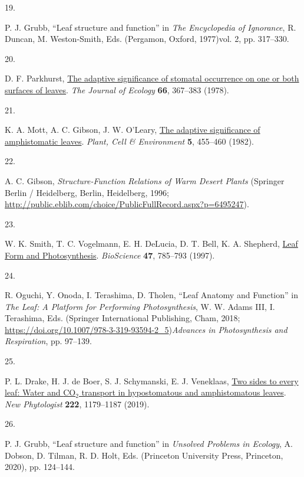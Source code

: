 \documentclass[
  letterpaper,
  DIV=11,
  numbers=noendperiod]{scrartcl}
\newlength{\cslhangindent}
\newlength{\csllabelwidth}
\newenvironment{CSLReferences}[2] %
 {\begin{list}{}{%
  \setlength{\itemindent}{0pt}
  \setlength{\leftmargin}{0pt}
  \setlength{\parsep}{0pt}
  \ifodd #1
   \setlength{\leftmargin}{\cslhangindent}
   \setlength{\itemindent}{-1\cslhangindent}
  \fi
  \setlength{\itemsep}{#2\baselineskip}}}
 {\end{list}}
\newcommand{\CSLLeftMargin}[1]{\parbox[t]{\csllabelwidth}{\strut#1\strut}}
\newcommand{\CSLRightInline}[1]{\parbox[t]{\linewidth - \csllabelwidth}{\strut#1\strut}}
\begin{document}
\begin{CSLReferences}{0}{1}
\CSLLeftMargin{19. }%
\CSLRightInline{P. J. Grubb, {``Leaf structure and function''} in
\emph{The Encyclopedia of Ignorance}, R. Duncan, M. Weston-Smith, Eds.
(Pergamon, Oxford, 1977)vol. 2, pp. 317--330.}

\CSLLeftMargin{20. }%
\CSLRightInline{D. F. Parkhurst,
\href{https://doi.org/10.2307/2259142}{The adaptive significance of
stomatal occurrence on one or both surfaces of leaves}. \emph{The
Journal of Ecology} \textbf{66}, 367--383 (1978).}

\CSLLeftMargin{21. }%
\CSLRightInline{K. A. Mott, A. C. Gibson, J. W. O'Leary,
\href{https://doi.org/10.1111/1365-3040.ep11611750}{The adaptive
significance of amphistomatic leaves}. \emph{Plant, Cell \& Environment}
\textbf{5}, 455--460 (1982).}

\CSLLeftMargin{22. }%
\CSLRightInline{A. C. Gibson, \emph{Structure-{Function} {Relations} of
{Warm} {Desert} {Plants}} (Springer Berlin / Heidelberg, Berlin,
Heidelberg, 1996;
\url{http://public.eblib.com/choice/PublicFullRecord.aspx?p=6495247}).}

\CSLLeftMargin{23. }%
\CSLRightInline{W. K. Smith, T. C. Vogelmann, E. H. DeLucia, D. T. Bell,
K. A. Shepherd, \href{https://doi.org/10.2307/1313100}{Leaf {Form} and
{Photosynthesis}}. \emph{BioScience} \textbf{47}, 785--793 (1997).}

\CSLLeftMargin{24. }%
\CSLRightInline{R. Oguchi, Y. Onoda, I. Terashima, D. Tholen, {``Leaf
{Anatomy} and {Function}''} in \emph{The {Leaf}: {A} {Platform} for
{Performing} {Photosynthesis}}, W. W. Adams III, I. Terashima, Eds.
(Springer International Publishing, Cham, 2018;
\url{https://doi.org/10.1007/978-3-319-93594-2_5})\emph{Advances in
{Photosynthesis} and {Respiration}}, pp. 97--139.}

\CSLLeftMargin{25. }%
\CSLRightInline{P. L. Drake, H. J. de Boer, S. J. Schymanski, E. J.
Veneklaas, \href{https://doi.org/10.1111/nph.15652}{Two sides to every
leaf: Water and {CO}\(_{\textrm{2}}\) transport in hypostomatous and
amphistomatous leaves}. \emph{New Phytologist} \textbf{222}, 1179--1187
(2019).}

\CSLLeftMargin{26. }%
\CSLRightInline{P. J. Grubb, {``Leaf structure and function''} in
\emph{Unsolved {Problems} in {Ecology}}, A. Dobson, D. Tilman, R. D.
Holt, Eds. (Princeton University Press, Princeton, 2020), pp. 124--144.}


\end{CSLReferences}
\end{document}
